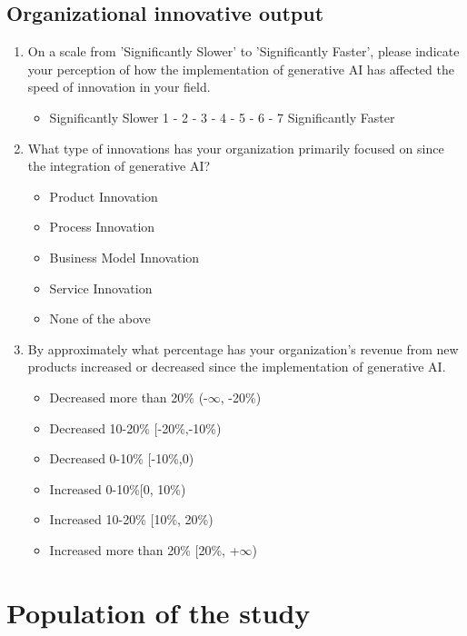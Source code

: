 \documentclass[UTF8,a4paper,AutoFakeBold,AutoFakeSlant]{article}
\begin{document}
\subsection{Organizational innovative output}

\begin{enumerate}
    \item On a scale from 'Significantly Slower' to 'Significantly Faster', please indicate your perception of how the implementation of generative AI has affected the speed of innovation in your field.
    \begin{itemize}
        \item Significantly Slower 1 - 2 - 3 - 4 - 5 - 6 - 7 Significantly Faster
    \end{itemize}
    \item What type of innovations has your organization primarily focused on since the integration of generative AI?
    \begin{itemize}
        \item Product Innovation
        \item Process Innovation
        \item Business Model Innovation
        \item Service Innovation
        \item None of the above
    \end{itemize}
    \item By approximately what percentage has your organization's revenue from new products increased or decreased since the implementation of generative AI.
    \begin{itemize}
        \item Decreased more than 20\% (-$\infty$, -20\%)
        \item Decreased 10-20\% [-20\%,-10\%)
        \item Decreased 0-10\% [-10\%,0)
        \item Increased 0-10\%[0, 10\%)
        \item Increased 10-20\% [10\%, 20\%)
        \item Increased more than 20\% [20\%, +$\infty$)
    \end{itemize}
\end{enumerate}



\section{Population of the study}
\end{document}
